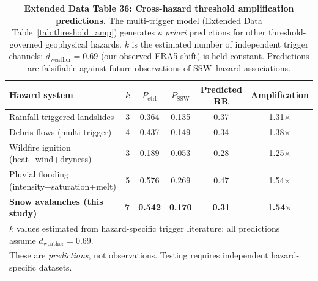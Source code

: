 \documentclass[11pt,letterpaper]{article}
\begin{document}
\begin{table}[h!]
\centering
\caption{\textbf{Extended Data Table 36: Cross-hazard threshold amplification predictions.} The multi-trigger model (Extended Data Table~\ref{tab:threshold_amp}) generates \emph{a priori} predictions for other threshold-governed geophysical hazards. $k$ is the estimated number of independent trigger channels; $d_{\mathrm{weather}} = 0.69$ (our observed ERA5 shift) is held constant. Predictions are falsifiable against future observations of SSW--hazard associations.}
\label{tab:cross_hazard}
\begin{tabular}{lrcccc}
\toprule
Hazard system & $k$ & $P_{\mathrm{ctrl}}$ & $P_{\mathrm{SSW}}$ & Predicted RR & Amplification \\
\midrule
Rainfall-triggered landslides & 3 & 0.364 & 0.135 & 0.37 & 1.31$\times$ \\
Debris flows (multi-trigger) & 4 & 0.437 & 0.149 & 0.34 & 1.38$\times$ \\
Wildfire ignition (heat+wind+dryness) & 3 & 0.189 & 0.053 & 0.28 & 1.25$\times$ \\
Pluvial flooding (intensity+saturation+melt) & 5 & 0.576 & 0.269 & 0.47 & 1.54$\times$ \\
\textbf{Snow avalanches (this study)} & \textbf{7} & \textbf{0.542} & \textbf{0.170} & \textbf{0.31} & \textbf{1.54$\times$} \\
\bottomrule
\multicolumn{6}{l}{\footnotesize $k$ values estimated from hazard-specific trigger literature; all predictions assume $d_{\mathrm{weather}} = 0.69$.} \\
\multicolumn{6}{l}{\footnotesize These are \emph{predictions}, not observations. Testing requires independent hazard-specific datasets.} \\
\end{tabular}
\end{table}
\end{document}
